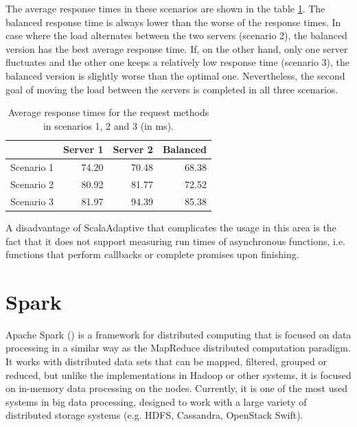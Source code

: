 The average response times in these scenarios are shown in the table \ref{tab:load_balance_resp_avgs}. The balanced response time is always lower than the worse of the response times. In case where the load alternates between the two servers (scenario 2), the balanced version has the best average response time. If, on the other hand, only one server fluctuates and the other one keeps a relatively low response time (scenario 3), the balanced version is slightly worse than the optimal one. Nevertheless, the second goal of moving the load between the servers is completed in all three scenarios.

\begin{table}[h!]
	\centering
	\captionsetup{justification=centering,margin=0.5cm}
		\bgroup
	\def\arraystretch{1.5}%
	
	\begin{tabular}{|l|r|r|r|}
		\hline
		& \textbf{Server 1}& \textbf{Server 2}& \textbf{Balanced}\\ \hline
		Scenario 1 & 74.20             & 70.48             & 68.38             \\ \hline
		Scenario 2 & 80.92             & 81.77             & 72.52             \\ \hline
		Scenario 3 & 81.97             & 94.39             & 85.38             \\ \hline
	\end{tabular}
	\egroup
	\caption{Average response times for the request methods in scenarios 1, 2 and 3 (in ms).}
\label{tab:load_balance_resp_avgs}
\end{table}

A disadvantage of ScalaAdaptive that complicates the usage in this area is the fact that it does not support measuring run times of asynchronous functions, i.e. functions that perform callbacks or complete promises upon finishing.

\section{Spark}

Apache Spark (\cite{noauthor_apache_nodate}) is a framework for distributed computing that is focused on data processing in a similar way as the MapReduce distributed computation paradigm. It works with distributed data sets that can be mapped, filtered, grouped or reduced, but unlike the implementations in Hadoop or other systems, it is focused on in-memory data processing on the nodes. Currently, it is one of the most used systems in big data processing, designed to work with a large variety of distributed storage systems (e.g. HDFS, Cassandra, OpenStack Swift).

